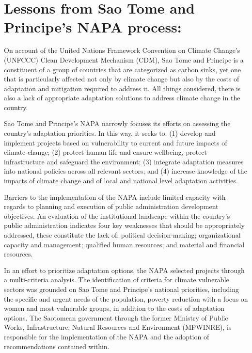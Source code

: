 \documentclass[
]{book}
\begin{document}
\hypertarget{lessons-from-sao-tome-and-principes-napa-process-1}{%
\section{Lessons from Sao Tome and Principe's NAPA process:}\label{lessons-from-sao-tome-and-principes-napa-process-1}}

On account of the United Nations Framework Convention on Climate Change's (UNFCCC) Clean Development Mechanism (CDM), Sao Tome and Principe is a constituent of a group of countries that are categorized as carbon sinks, yet one that is particularly affected not only by climate change but also by the costs of adaptation and mitigation required to address it. All things considered, there is also a lack of appropriate adaptation solutions to address climate change in the country.

Sao Tome and Principe's NAPA narrowly focuses its efforts on assessing the country's adaptation priorities. In this way, it seeks to: (1) develop and implement projects based on vulnerability to current and future impacts of climate change; (2) protect human life and ensure wellbeing, protect infrastructure and safeguard the environment; (3) integrate adaptation measures into national policies across all relevant sectors; and (4) increase knowledge of the impacts of climate change and of local and national level adaptation activities.

Barriers to the implementation of the NAPA include limited capacity with regards to planning and execution of public administration development objectives. An evaluation of the institutional landscape within the country's public administration indicates four key weaknesses that should be appropriately addressed, these constitute the lack of: political decision-making; organizational capacity and management; qualified human resources; and material and financial resources.

In an effort to prioritize adaptation options, the NAPA selected projects through a multi-criteria analysis. The identification of criteria for climate vulnerable sectors was grounded on Sao Tome and Principe's national priorities, including the specific and urgent needs of the population, poverty reduction with a focus on women and most vulnerable groups, in addition to the costs of adaptation options. The Saotomean government through the former Ministry of Public Works, Infrastructure, Natural Resources and Environment (MPWINRE), is responsible for the implementation of the NAPA and the adoption of recommendations contained within.
\end{document}
